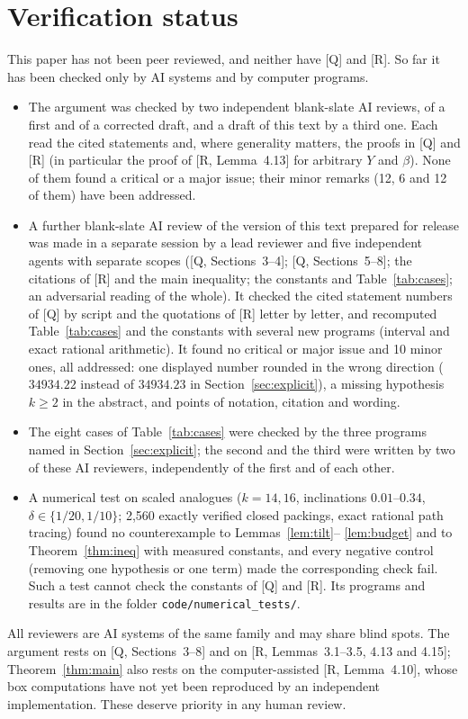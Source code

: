 \documentclass[11pt]{amsart}
\theoremstyle{definition}
\theoremstyle{remark}
\numberwithin{equation}{section}
\begin{document}
\section*{Verification status}
This paper has not been peer reviewed, and neither have [Q] and [R]. So far it has been checked only by AI systems and
by computer programs.
\begin{itemize}
\item The argument was checked by two independent blank-slate AI reviews, of a first and of a corrected draft, and a
draft of this text by a third one. Each read the cited statements and, where generality matters, the proofs in [Q] and
[R] (in particular the proof of [R, Lemma~4.13] for arbitrary $Y$ and $\beta$). None of them found a critical or a major
issue; their minor remarks (12, 6 and 12 of them) have been addressed.
\item A further blank-slate AI review of the version of this text prepared for release was made in a separate session
by a lead reviewer and five independent agents with separate scopes ([Q, Sections~3--4]; [Q, Sections~5--8]; the
citations of [R] and the main inequality; the constants and Table~\ref{tab:cases}; an adversarial reading of the whole).
It checked the cited statement numbers of [Q] by script and the quotations of [R] letter by letter, and recomputed
Table~\ref{tab:cases} and the constants with several new programs (interval and exact rational arithmetic). It found
no critical or major issue and 10 minor ones, all addressed: one displayed number rounded in the wrong direction
($34934.22$ instead of $34934.23$ in Section~\ref{sec:explicit}), a missing hypothesis $k\ge2$ in the abstract, and
points of notation, citation and wording.
\item The eight cases of Table~\ref{tab:cases} were checked by the three programs named in
Section~\ref{sec:explicit}; the second and the third were written by two of these AI reviewers, independently of the
first and of each other.
\item A numerical test on scaled analogues ($k=14,16$, inclinations $0.01$--$0.34$, $\delta\in\{1/20,1/10\}$; 2{,}560
exactly verified closed packings, exact rational path tracing) found no counterexample to Lemmas~\ref{lem:tilt}--%
\ref{lem:budget} and to Theorem~\ref{thm:ineq} with measured constants, and every negative control (removing one
hypothesis or one term) made the corresponding check fail. Such a test cannot check the constants of [Q] and [R].
Its programs and results are in the folder \texttt{code/numerical\_tests/}.
\end{itemize}
All reviewers are AI systems of the same family and may share blind spots. The argument rests on [Q, Sections~3--8] and
on [R, Lemmas~3.1--3.5, 4.13 and 4.15]; Theorem~\ref{thm:main} also rests on the computer-assisted [R, Lemma~4.10],
whose box computations have not yet been reproduced by an independent implementation. These deserve priority in any
human review.
\end{document}
